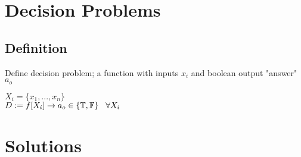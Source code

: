 \documentclass[11pt]{article}
\def \loop {\ensuremath{\rotatebox[origin=c]{-90}{$\circlearrowright$}}}
\def \nestedloop {\ensuremath{\rotatebox[origin=c]{-90}{$\circlearrowright$}}^n}
\begin{document}
















\newpage
\section{Decision Problems}

\subsection{Definition}
Define decision problem; a function with inputs $x_i$ and boolean output "answer" $a_o$
\begin{center}
$
X_i = \{x_1,...,x_n\}
$
\\ \vspace{2mm}
$
D := f \lbrack X_i \rbrack \rightarrow a_{o} \in \{\mathbb{T}, \mathbb{F}\} \hspace{3mm} \forall X_i
$
\end{center}







\section{Solutions}
\end{document}
